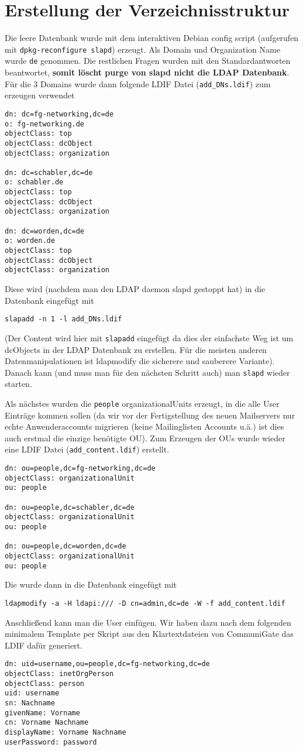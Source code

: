 \documentclass[11pt,a4paper,titlepage=firstiscover,headsepline]{scrartcl} %
\begin{document}
\newpage
\section{Erstellung der Verzeichnisstruktur}\label{sec:Erstelle-DB}
Die leere Datenbank wurde mit dem interaktiven Debian config script (aufgerufen mit \texttt{dpkg-reconfigure slapd}) erzeugt. Als Domain und Organization Name wurde \texttt{de} genommen. Die restlichen Fragen wurden mit den Standardantworten beantwortet, \textbf{somit löscht purge von slapd nicht die LDAP Datenbank}. Für die 3 Domains wurde dann folgende LDIF Datei (\texttt{add\_DNs.ldif}) zum erzeugen verwendet
\begin{lstlisting}
dn: dc=fg-networking,dc=de
o: fg-networking.de
objectClass: top
objectClass: dcObject
objectClass: organization

dn: dc=schabler,dc=de
o: schabler.de
objectClass: top
objectClass: dcObject
objectClass: organization

dn: dc=worden,dc=de
o: worden.de
objectClass: top
objectClass: dcObject
objectClass: organization

\end{lstlisting}
Diese wird (nachdem man den LDAP daemon slapd gestoppt hat) in die Datenbank eingefügt mit
\begin{lstlisting}
slapadd -n 1 -l add_DNs.ldif
\end{lstlisting}
(Der Content wird hier mit \texttt{slapadd} eingefügt da dies der einfachste Weg ist um dcObjects in der LDAP Datenbank zu erstellen. Für die meisten anderen Datenmanipulationen ist ldapmodify die sicherere und sauberere Variante). Danach kann (und muss man für den nächsten Schritt auch) man \texttt{slapd} wieder starten.

Als nächstes wurden die \texttt{people} organizationalUnits erzeugt, in die alle User Einträge kommen sollen (da wir vor der Fertigstellung des neuen Mailservers nur echte Anwenderaccounts migrieren (keine Mailinglisten Accounts u.ä.) ist dies auch erstmal die einzige benötigte OU). Zum Erzeugen der OUs wurde wieder eine LDIF Datei (\texttt{add\_content.ldif}) erstellt.
\begin{lstlisting}
dn: ou=people,dc=fg-networking,dc=de
objectClass: organizationalUnit
ou: people

dn: ou=people,dc=schabler,dc=de
objectClass: organizationalUnit
ou: people

dn: ou=people,dc=worden,dc=de
objectClass: organizationalUnit
ou: people
\end{lstlisting}
Die wurde dann in die Datenbank eingefügt mit
\begin{lstlisting}
ldapmodify -a -H ldapi:/// -D cn=admin,dc=de -W -f add_content.ldif
\end{lstlisting}
Anschließend kann man die User einfügen. Wir haben dazu nach dem folgenden minimalem Template per Skript aus den Klartextdateien von CommuniGate das LDIF dafür generiert.
\begin{lstlisting}
dn: uid=username,ou=people,dc=fg-networking,dc=de
objectClass: inetOrgPerson
objectClass: person
uid: username
sn: Nachname
givenName: Vorname
cn: Vorname Nachname
displayName: Vorname Nachname
userPassword: password
\end{lstlisting}
\end{document}
